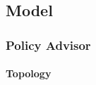 \documentclass{article}
\begin{document}
	    \subsection{Model}

            \subsubsection{Policy Advisor}

                \paragraph{Topology}

\end{document}
